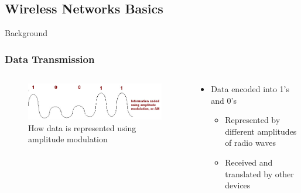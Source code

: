 \documentclass{beamer}
\begin{document}
\subsection{Wireless Networks Basics}

\begin{frame}{Background}
  \frametitle{Data Transmission}
  \begin{columns}
    \begin{column}{0.5\textwidth}
        \begin{figure}[htbp]
          \centering
          \includegraphics[width=\textwidth]{AMdataTransmission.jpg}
          \caption{How data is represented using amplitude modulation\cite{AMdata}}
          \label{fig:AM_data_transmission}
        \end{figure}
    \end{column}
    \begin{column}{0.5\textwidth}
      \begin{itemize}
        \item Data encoded into 1's and 0's
          \begin{itemize}
            \item Represented by different amplitudes of radio waves
            \item Received and translated by other devices
          \end{itemize}
      \end{itemize}
    \end{column}
  \end{columns}
\end{frame}
\end{document}
